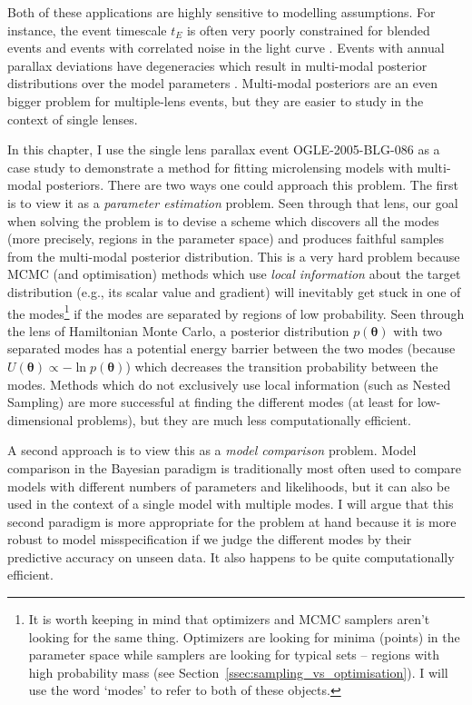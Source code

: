 \documentclass[12pt,dvipsnames]{report}
\renewcommand{\vec}[1]{\boldsymbol{\mathbf{#1}}}
\begin{document}
Both of these applications are highly sensitive to modelling assumptions. For instance, 
the event timescale $t_E$ is often very poorly constrained \citep{2009MNRAS.393..816D} 
for blended events and events with correlated noise in the light curve \citep{golovich2022}. 
Events with annual parallax deviations have degeneracies 
which result in multi-modal posterior distributions over the model parameters \citep{2004ApJ...606..319G}.
Multi-modal posteriors are an even bigger problem for multiple-lens events, but they are 
easier to study in the context of single lenses. 

In this chapter, I use the single lens parallax event OGLE-2005-BLG-086 as a case study
to demonstrate a method for fitting microlensing models with multi-modal posteriors. There are two 
ways one could approach this problem. The first is to view it as a \emph{parameter estimation}
problem. Seen through that lens, our goal when solving the problem is to devise a scheme 
which discovers all the modes (more precisely, regions in the parameter space) and 
produces faithful samples from the multi-modal  posterior distribution. 
This is a very hard problem because MCMC (and optimisation) methods which 
use \emph{local information} about the target distribution (e.g., its scalar value and gradient) will inevitably get 
stuck in one of the modes\footnote{
    It is worth keeping in mind that optimizers and MCMC samplers aren't looking for 
    the same thing. Optimizers are looking for minima (points) in the parameter 
    space while samplers are looking for typical sets -- regions with high probability 
    mass (see Section~\ref{ssec:sampling_vs_optimisation}). I will use the word `modes' to refer to both of these objects.}
 if the modes are separated by regions of low probability. 
Seen through the lens of Hamiltonian Monte Carlo, a posterior distribution 
$p(\vec\theta)$ with two separated modes has a potential energy barrier between the 
two modes (because  $U(\vec\theta)\propto -\ln p(\vec\theta)$) which decreases
the transition probability between the modes. Methods which do not exclusively use 
local information (such as Nested Sampling) are more successful at finding the different modes 
(at least for low-dimensional problems), but they are much less computationally efficient.

A second approach is to view this as a \emph{model comparison} problem. Model comparison
in the Bayesian paradigm is traditionally most often used to compare 
models with different numbers of parameters and likelihoods, but it can also be used 
in the context of a single model with multiple modes. 
I will argue that this second 
paradigm is more appropriate for the problem at hand because it is more robust to 
model misspecification  if we judge the different modes by their predictive accuracy
on unseen data. It also happens to be quite computationally efficient.
\end{document}
